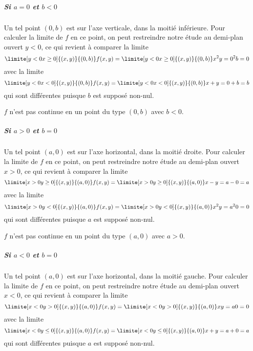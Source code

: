 \begin{example}
\subparagraph{Si $a = 0$ et $b < 0$} Un tel point $(0,b)$ est sur
l'axe verticale, dans la moitié inférieure. Pour calculer la limite de
$f$ en ce point, on peut restreindre notre étude au demi-plan ouvert
$y < 0$, ce qui revient à comparer la limite
\begin{equation*}
  \limite[y<0\\x\geq 0] {(x,y)} {(0,b)} f(x,y) =   \limite[y<0\\x\geq
  0] {(x,y)} {(0,b)} x^2 y = 0^2 b = 0
\end{equation*}
avec la limite
\begin{equation*}
  \limite[y<0\\x<0] {(x,y)} {(0,b)} f(x,y) =   \limite[y<0\\x<0]
  {(x,y)} {(0,b)} x+y = 0 + b = b
\end{equation*}
qui sont différentes puisque $b$ est supposé non-nul.

\conclusion $f$ n'est pas continue en un point du type $(0,b)$ avec $b
< 0$.

\subparagraph{Si $a > 0$ et $b = 0$} Un tel point $(a,0)$ est sur
l'axe horizontal, dans la moitié droite. Pour calculer la limite de
$f$ en ce point, on peut restreindre notre étude au demi-plan ouvert
$x > 0$, ce qui revient à comparer la limite
\begin{equation*}
  \limite[x>0\\y \geq 0] {(x,y)} {(a,0)} f(x,y) =   \limite[x>0\\y \geq
  0] {(x,y)} {(a,0)} x-y = a - 0 = a
\end{equation*}
avec la limite
\begin{equation*}
  \limite[x>0\\y < 0] {(x,y)} {(a,0)} f(x,y) =   \limite[x>0\\y < 0]
  {(x,y)} {(a,0)} x^2y = a^2 0 = 0
\end{equation*}
qui sont différentes puisque $a$ est supposé non-nul.

\conclusion $f$ n'est pas continue en un point du type $(a,0)$ avec $a
> 0$.

\subparagraph{Si $a < 0$ et $b = 0$} Un tel point $(a,0)$ est sur
l'axe horizontal, dans la moitié gauche. Pour calculer la limite de
$f$ en ce point, on peut restreindre notre étude au demi-plan ouvert
$x < 0$, ce qui revient à comparer la limite
\begin{equation*}
  \limite[x<0\\y> 0] {(x,y)} {(a,0)} f(x,y) =   \limite[x<0\\y>
  0] {(x,y)} {(a,0)} x y = a 0 = 0
\end{equation*}
avec la limite
\begin{equation*}
  \limite[x<0\\y\leq 0] {(x,y)} {(a,0)} f(x,y) =   \limite[x<0\\y\leq0]
  {(x,y)} {(a,0)} x+y = a + 0 = a
\end{equation*}
qui sont différentes puisque $a$ est supposé non-nul.


\end{example}
